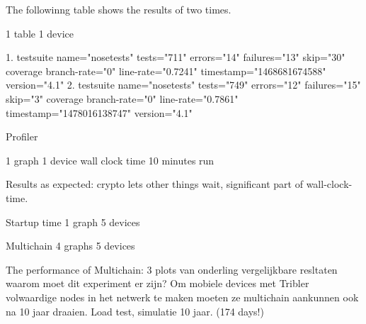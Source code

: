 The followinng table shows the results of two times.

1 table
1 device

1.
testsuite name="nosetests" tests="711" errors="14" failures="13" skip="30"
coverage branch-rate="0" line-rate="0.7241" timestamp="1468681674588" version="4.1"
2.
testsuite name="nosetests" tests="749" errors="12" failures="15" skip="3"
coverage branch-rate="0" line-rate="0.7861" timestamp="1478016138747" version="4.1"








Profiler

1 graph
1 device
wall clock time
10 minutes run

Results as expected: crypto lets other things wait, significant part of wall-clock-time.



Startup time
1 graph
5 devices


Multichain
4 graphs
5 devices

The performance of Multichain:
3 plots van onderling vergelijkbare resltaten
waarom moet dit experiment er zijn?
Om mobiele devices met Tribler volwaardige nodes in het netwerk te maken moeten ze multichain aankunnen ook na 10 jaar draaien.
Load test, simulatie 10 jaar. (174 days!)
